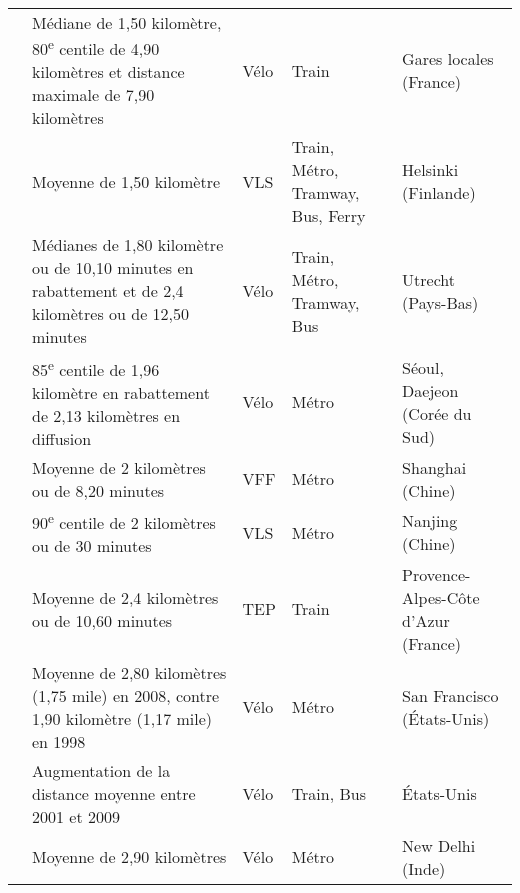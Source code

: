 \begin{longtable}{p{3cm}p{4cm}p{1.5cm}p{1.8cm}p{2.3cm}}
    \small{\textcite{hasiak_access_2019}}\index{Hasiak, Sophie|pagebf} & \small{Médiane de 1,50 kilomètre, 80\textsuperscript{e} centile de 4,90 kilomètres et distance maximale de 7,90 kilomètres} & \small{Vélo} & \small{Train} & \small{Gares locales (France)}\\
    \small{\textcite{jappinen_modelling_2013}}\index{Jäppinen, Sakari|pagebf} & \small{Moyenne de 1,50 kilomètre} & \small{VLS} & \small{Train, Métro, Tramway, Bus, Ferry} & \small{Helsinki (Finlande)}\\
    \small{\textcite{krygsman_multimodal_2004}}\index{Krygsman, Stephan|pagebf} & \small{Médianes de 1,80 kilomètre ou de 10,10 minutes en \gls{rabattement} et de 2,4 kilomètres ou de 12,50 minutes} & \small{Vélo} & \small{Train, Métro, Tramway, Bus} & \small{Utrecht (Pays-Bas)}\\
    \small{\textcite{lee_bicycle-based_2016}}\index{Lee, Jaeyeong|pagebf} & \small{85\textsuperscript{e} centile de 1,96 kilomètre en \gls{rabattement} de 2,13 kilomètres en \gls{diffusion}} & \small{Vélo} & \small{Métro} & \small{Séoul, Daejeon (Corée du Sud)}\\
    \small{\textcite{lin_analysis_2019}}\index{Lin, Diao|pagebf} & \small{Moyenne de 2 kilomètres ou de 8,20 minutes} & \small{VFF} & \small{Métro} & \small{Shanghai (Chine)}\\
    \small{\textcite{ma_understanding_2018}}\index{Ma, Xinwei|pagebf} & \small{90\textsuperscript{e} centile de 2 kilomètres ou de 30 minutes} & \small{VLS} & \small{Métro} & \small{Nanjing (Chine)}\\
    \small{\textcite{moinse_intermodal_2022}}\index{Moinse, Dylan|pagebf} & \small{Moyenne de 2,4 kilomètres ou de 10,60 minutes} & \small{TEP} & \small{Train} & \small{Provence-Alpes-Côte d'Azur (France)}\\
    \small{\textcite{cervero_bike-and-ride_2013}}\index{Cervero, Robert|pagebf} & \small{Moyenne de 2,80 kilomètres (1,75 mile) en 2008, contre 1,90 kilomètre (1,17 mile) en 1998} & \small{Vélo} & \small{Métro} & \small{San Francisco (États-Unis)}\\
    \small{\textcite{wang_bicycle-transit_2013}}\index{Wang, Rui|pagebf} & \small{Augmentation de la distance moyenne entre 2001 et 2009} & \small{Vélo} & \small{Train, Bus} & \small{États-Unis}\\
    \small{\textcite{ann_examination_2019}}\index{Ann, Sangeetha|pagebf} & \small{Moyenne de 2,90 kilomètres} & \small{Vélo} & \small{Métro} & \small{New Delhi (Inde)}\\

\end{longtable}
